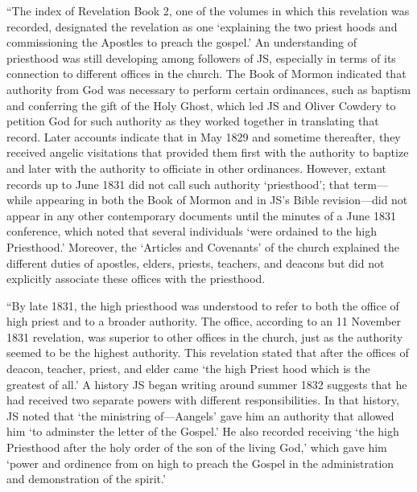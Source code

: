 			``The index of Revelation Book 2, one of the volumes in which this revelation was recorded, designated the revelation as one `explaining the two priest hoods and commissioning the Apostles to preach the gospel.' An understanding of priesthood was still developing among followers of JS, especially in terms of its connection to different offices in the church. The Book of Mormon indicated that authority from God was necessary to perform certain ordinances, such as baptism and conferring the gift of the Holy Ghost, which led JS and Oliver Cowdery to petition God for such authority as they worked together in translating that record. Later accounts indicate that in May 1829 and sometime thereafter, they received angelic visitations that provided them first with the authority to baptize and later with the authority to officiate in other ordinances. However, extant records up to June 1831 did not call such authority `priesthood'; that term---while appearing in both the Book of Mormon and in JS's Bible revision---did not appear in any other contemporary documents until the minutes of a June 1831 conference, which noted that several individuals `were ordained to the high Priesthood.' Moreover, the `Articles and Covenants' of the church explained the different duties of apostles, elders, priests, teachers, and deacons but did not explicitly associate these offices with the priesthood.

			``By late 1831, the high priesthood was understood to refer to both the office of high priest and to a broader authority. The office, according to an 11 November 1831 revelation, was superior to other offices in the church, just as the authority seemed to be the highest authority. This revelation stated that after the offices of deacon, teacher, priest, and elder came `the high Priest hood which is the greatest of all.' A history JS began writing around summer 1832 suggests that he had received two separate powers with different responsibilities. In that history, JS noted that `the ministring of---Aangels' gave him an authority that allowed him `to adminster the letter of the Gospel.' He also recorded receiving `the high Priesthood after the holy order of the son of the living God,' which gave him `power and ordinence from on high to preach the Gospel in the administration and demonstration of the spirit.'

